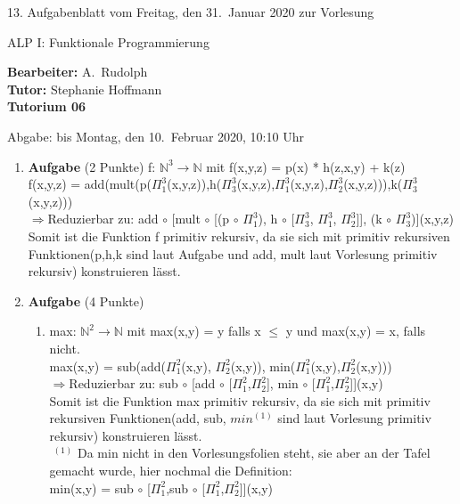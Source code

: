 \documentclass[11pt]{article}
\newcommand{\VORLESUNG}{ALP I: Funktionale Programmierung}
\newcommand{\STAFF}{A.\ Rudolph}
\newcommand{\ASSIGNMENT}{13}
\newcommand{\HANDOUT}{Freitag, den 31.\ Januar   2020}
\newcommand{\TUTOR}{Stephanie Hoffmann}
\newcommand{\DELIVER}{bis Montag, den 10.\ Februar 2020, 10:10 Uhr}
\newcommand{\punkte}[1]{{\small{ }(#1 Punkte)}}
\newcommand{\aufgabe}[1]{\item{\bf #1}}
\begin{document}
\begin{center}
\ASSIGNMENT{}. Aufgabenblatt vom \HANDOUT{} zur Vorlesung 
\vspace*{0.5cm}

{\Large \VORLESUNG{}}

\textbf{Bearbeiter:} \STAFF{}\\
\textbf{Tutor:} \TUTOR\\
\textbf{Tutorium 06}
\vspace*{0.5cm}

{\small Abgabe: \DELIVER{}}
\vspace*{1cm}
\end{center}

\begin{enumerate}
\aufgabe{Aufgabe}\punkte{2}
f: $\mathbb{N}^3 \rightarrow \mathbb{N}$ mit f(x,y,z) = p(x) * h(z,x,y) + k(z)\\
\newline
f(x,y,z) = add(mult(p($\Pi_1^3$(x,y,z)),h($\Pi_3^3$(x,y,z),$\Pi_1^3$(x,y,z),$\Pi_2^3$(x,y,z))),k($\Pi_3^3$(x,y,z)))\\
\newline
$\Rightarrow$Reduzierbar zu: add $\circ$ [mult $\circ$ [(p $\circ$ $\Pi_1^3$), h $\circ$ [$\Pi_3^3$, $\Pi_1^3$, $\Pi_2^3$]], (k $\circ$ $\Pi_3^3$)](x,y,z)\\
Somit ist die Funktion f primitiv rekursiv, da sie sich mit primitiv rekursiven Funktionen(p,h,k sind laut Aufgabe und add, mult laut Vorlesung primitiv rekursiv) konstruieren lässt.\\

\aufgabe{Aufgabe}\punkte{4}
\begin{enumerate}
\item[a)] max: $\mathbb{N}^2 \rightarrow \mathbb{N}$ mit max(x,y) = y falls x $\leq$ y und max(x,y) = x, falls nicht.\\
\newline
max(x,y) = sub(add($\Pi_1^2$(x,y), $\Pi_2^2$(x,y)), min($\Pi_1^2$(x,y),$\Pi_2^2$(x,y)))\\
\newline
$\Rightarrow$Reduzierbar zu: sub $\circ$ [add $\circ$ [$\Pi_1^2$,$\Pi_2^2$], min $\circ$ [$\Pi_1^2$,$\Pi_2^2$]](x,y)\\
Somit ist die Funktion max primitiv rekursiv, da sie sich mit primitiv rekursiven Funktionen(add, sub, $min^{(1)}$ sind laut Vorlesung primitiv rekursiv) konstruieren lässt.\\
\newline
\newline
$\phantom{.}^{(1)}$ Da min nicht in den Vorlesungsfolien steht, sie aber an der Tafel gemacht wurde, hier nochmal die Definition:\\
\newline
min(x,y) = sub $\circ$ [$\Pi_1^2$,sub $\circ$ [$\Pi_1^2$,$\Pi_2^2$]](x,y)\\


\end{enumerate}
\end{enumerate}
\end{document}
